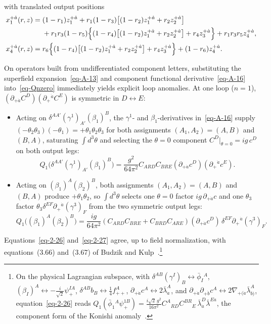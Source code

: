 \documentclass[11pt]{article}
\numberwithin{equation}{section}
\numberwithin{figure}{section}
\numberwithin{table}{section}
\begin{document}
with translated output positions
\begin{equation*}
\begin{aligned}
x_1^{+\dot a}(r,z)
={}&(1-r_1)z_1^{+\dot a}
+r_1(1-r_3)\big[(1-r_2)z_1^{+\dot a}+r_2z_2^{+\dot a}\big]\\
&+r_1r_3(1-r_5)\Bigl\{(1-r_4)\big[(1-r_2)z_1^{+\dot a}+r_2z_2^{+\dot a}\big]+r_4z_3^{+\dot a}\Bigr\}
+r_1r_3r_5z_4^{+\dot a},\\
x_4^{+\dot a}(r,z)
={}&r_6\Bigl\{(1-r_4)\big[(1-r_2)z_1^{+\dot a}+r_2z_2^{+\dot a}\big]+r_4z_3^{+\dot a}\Bigr\}
+(1-r_6)z_4^{+\dot a}.
\end{aligned}
\end{equation*}

On operators built from undifferentiated component letters, substituting the superfield expansion~\eqref{eq-A-13} and component functional derivative~\eqref{eq-A-16} into~\eqref{eq-Qnzero} immediately yields explicit loop anomalies. At one loop ($n=1$), $(\partial_{+\dot a}C^D)(\partial_+{}^{\dot a}C^E)$ is symmetric in $D\leftrightarrow E$:
\begin{itemize}
\item Acting on $\delta^{AA'}(\gamma^1)_{A'}(\beta_1)^B$, the $\gamma^1$- and $\beta_1$-derivatives in~\eqref{eq-A-16} supply $(-\theta_2\theta_3)(-\theta_1)=+\theta_1\theta_2\theta_3$ for both assignments $(A_1,A_2)=(A,B)$ and $(B,A)$, saturating $\int d^3\theta$ and selecting the $\theta=0$ component $C^D|_{\theta=0}=ig\,c^D$ on both output legs:
\begin{equation}\label{eq-2-26}
Q_1\big(\delta^{AA'}(\gamma^1)_{A'}(\beta_1)^B\big)=\frac{g^2}{64\pi^2}C_{ARD}C_{BRE}(\partial_{+\dot a}c^D)(\partial_+{}^{\dot a}c^E).
\end{equation}
\item Acting on $(\beta_1)^A(\beta_2)^B$, both assignments $(A_1,A_2)=(A,B)$ and $(B,A)$ produce $+\theta_1\theta_2$, so $\int d^3\theta$ selects one $\theta=0$ factor $ig\,\partial_{+\dot a}c$ and one $\theta_3$ factor $\theta_3\delta^{EF}\partial_+{}^{\dot a}(\gamma^3)_F$ from the two symmetric output legs:
\begin{equation}\label{eq-2-27}
Q_1\big((\beta_1)^A(\beta_2)^B\big)=\frac{ig}{64\pi^2}(C_{ARD}C_{BRE}+C_{BRD}C_{ARE})(\partial_{+\dot a}c^D)\,\delta^{EF}\partial_+{}^{\dot a}(\gamma^3)_F.
\end{equation}
\end{itemize}
Equations~\eqref{eq-2-26} and~\eqref{eq-2-27} agree, up to field normalization, with equations~(3.66) and~(3.67) of Budzik and Kulp~\cite{BK}.\footnote{On the physical Lagrangian subspace, with $\delta^{AB}(\gamma^I)_B\leftrightarrow\bar\phi_I{}^A$, $(\beta_I)^A\leftrightarrow-\frac{i}{\sqrt2}\psi_+^{IA}$, $\delta^{AB}b_B\leftrightarrow\frac14f_{++}^A$, $\partial_{+\dot a}c^A\leftrightarrow2\bar\lambda_{\dot a}^A$, and $\partial_{+\dot a}\partial_{+\dot b}c^A\leftrightarrow2\nabla_{+(\dot a}\bar\lambda_{\dot b)}^A$, equation~\eqref{eq-2-26} reads $Q_1(\bar\phi_1{}^A\psi_+^{1B})=\frac{i\sqrt2\,g^2}{16\pi^2}C^A{}_{RD}C^{BR}{}_E\,\bar\lambda_{\dot a}^D\bar\lambda^{E\dot a}$, the component form of the Konishi anomaly~\cite{Konishi}.}
\end{document}
